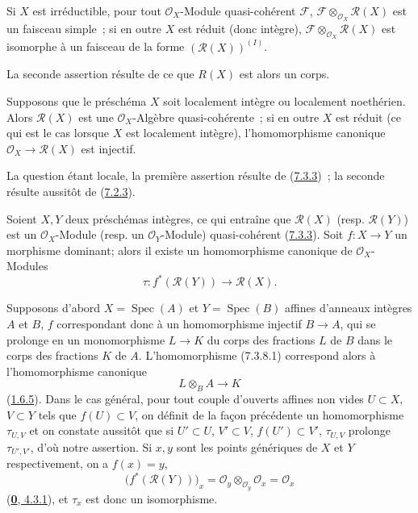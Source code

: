 \begin{corollary}[7.3.6]
\label{I.7.3.6-fr}
Si $X$ est irréductible, pour tout $\mathscr{O}_X$-Module quasi-cohérent
$\mathscr{F}$, $\mathscr{F}\otimes_{\mathscr{O}_X}\mathscr{R}(X)$ est un
faisceau simple~; si en outre $X$ est réduit (donc intègre),
$\mathscr{F}\otimes_{\mathscr{O}_X}\mathscr{R}(X)$ est isomorphe à un
faisceau de la forme $(\mathscr{R}(X))^{(I)}$.
\end{corollary}

La seconde assertion résulte de ce que $R(X)$ est alors un corps.

\begin{proposition}[7.3.7]
\label{I.7.3.7-fr}
Supposons que le préschéma $X$ soit localement intègre ou localement
noethérien. Alors $\mathscr{R}(X)$ est une $\mathscr{O}_X$-Algèbre
quasi-cohérente~; si en outre $X$ est réduit (ce qui est le cas lorsque $X$
est localement intègre), l'homomorphisme canonique
$\mathscr{O}_X\to\mathscr{R}(X)$ est injectif.
\end{proposition}

La question étant locale, la première assertion résulte de
(\hyperref[I.7.3.3-fr]{7.3.3})~; la seconde résulte aussitôt de
(\hyperref[I.7.2.3-fr]{7.2.3}).

\begin{env}[7.3.8]
\label{I.7.3.8-fr}
Soient $X,Y$ deux préschémas intègres, ce qui entraîne que
$\mathscr{R}(X)$ (resp. $\mathscr{R}(Y)$) est un $\mathscr{O}_X$-Module (resp. un
$\mathscr{O}_Y$-Module) quasi-cohérent (\hyperref[I.7.3.3-fr]{7.3.3}). Soit $f:X\to Y$ un
morphisme dominant; alors il existe un homomorphisme canonique de
$\mathscr{O}_X$-Modules
\[
  \tau:f^*(\mathscr{R}(Y))\to\mathscr{R}(X).
\tag{7.3.8.1}
\label{I.7.3.8.1-fr}
\]
\end{env}

Supposons d'abord $X=\operatorname{Spec}(A)$ et $Y=\operatorname{Spec}(B)$ affines d'anneaux
intègres $A$ et $B$, $f$ correspondant donc à un homomorphisme injectif
$B\to A$, qui se prolonge en un monomorphisme $L\to K$ du corps des
fractions $L$ de $B$ dans le corps des fractions $K$ de $A$.
L'homomorphisme (7.3.8.1) correspond alors à l'homomorphisme canonique
\[
  L\otimes_B A\to K
\]
(\hyperref[I.1.6.5-fr]{1.6.5}). Dans le cas général, pour tout couple d'ouverts affines non
vides $U\subset X$, $V\subset Y$ tels que $f(U)\subset V$, on définit
de la façon précédente un homomorphisme $\tau_{U,V}$ et on constate
aussitôt que si $U'\subset U$, $V'\subset V$,
$f(U')\subset V'$, $\tau_{U,V}$ prolonge $\tau_{U',V'}$, d'où notre
assertion. Si $x,y$ sont les points génériques de $X$ et $Y$
respectivement, on a $f(x)=y$,
\[
  \bigl(f^*(\mathscr{R}(Y))\bigr)_x
  =\mathscr{O}_y\otimes_{\mathscr{O}_y}\mathscr{O}_x
  =\mathscr{O}_x
\]
(\hyperref[0.4.3.1-fr]{\textbf{0}, 4.3.1}), et $\tau_x$ est donc un isomorphisme.

